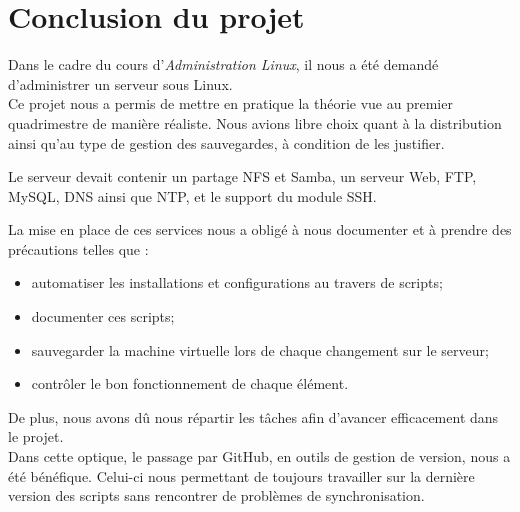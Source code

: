\section{Conclusion du projet}
\label{sec:conclusion-projet}

Dans le cadre du cours d'\emph{Administration Linux}, il nous a été demandé
d'administrer un serveur sous Linux. \\

Ce projet nous a permis de mettre en pratique la théorie vue au premier
quadrimestre de manière réaliste. Nous avions libre choix quant à la distribution
ainsi qu'au type de gestion des sauvegardes, à condition de les justifier.

Le serveur devait contenir un partage NFS et Samba, un serveur Web, FTP, MySQL,
DNS ainsi que NTP, et le support du module SSH.

La mise en place de ces services nous a obligé à nous documenter et à prendre
des précautions telles que :
\begin{itemize}
\item automatiser les installations et configurations au travers de scripts;
\item documenter ces scripts;
\item sauvegarder la machine virtuelle lors de chaque changement sur le serveur;
\item contrôler le bon fonctionnement de chaque élément. \\
\end{itemize}

De plus, nous avons dû nous répartir les tâches afin d'avancer efficacement
dans le projet. \\
Dans cette optique, le passage par GitHub, en outils de gestion
de version, nous a été bénéfique. Celui-ci nous permettant de toujours
travailler sur la dernière version des scripts sans rencontrer de problèmes de
synchronisation. \\

